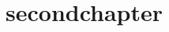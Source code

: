 \chapter{secondchapter}
\Blindtext
\Blindtext
\Blindtext
\Blindtext
\Blindtext
\Blindtext
\Blindtext
\Blindtext
\Blindtext
